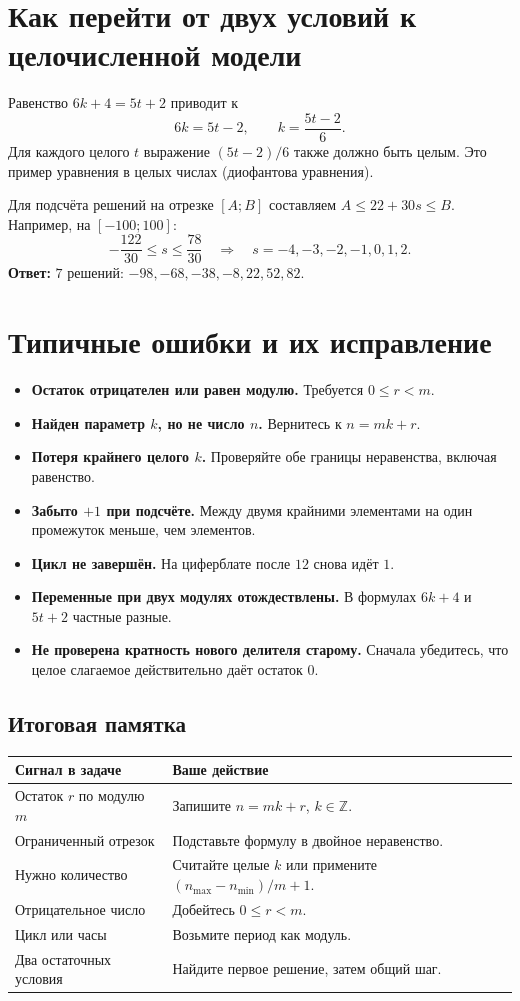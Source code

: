 \documentclass[a4paper,12pt]{article}
\newcommand{\topic}[1]{\section{#1}}
\begin{document}
\topic{Как перейти от двух условий к целочисленной модели}
Равенство $6k+4=5t+2$ приводит к
\[
6k=5t-2,\qquad k=\frac{5t-2}{6}.
\]
Для каждого целого $t$ выражение $(5t-2)/6$ также должно быть целым. Это пример уравнения в целых числах (диофантова уравнения).

Для подсчёта решений на отрезке $[A;B]$ составляем $A\le 22+30s\le B$.
Например, на $[-100;100]$:
\[
-\frac{122}{30}\le s\le\frac{78}{30}
\quad\Longrightarrow\quad s=-4,-3,-2,-1,0,1,2.
\]
\textbf{Ответ:} $7$ решений: $-98,-68,-38,-8,22,52,82$.

\topic{Типичные ошибки и их исправление}
\begin{itemize}
\item \textbf{Остаток отрицателен или равен модулю.} Требуется $0\le r<m$.
\item \textbf{Найден параметр $k$, но не число $n$.} Вернитесь к $n=mk+r$.
\item \textbf{Потеря крайнего целого $k$.} Проверяйте обе границы неравенства, включая равенство.
\item \textbf{Забыто $+1$ при подсчёте.} Между двумя крайними элементами на один промежуток меньше, чем элементов.
\item \textbf{Цикл не завершён.} На циферблате после $12$ снова идёт $1$.
\item \textbf{Переменные при двух модулях отождествлены.} В формулах $6k+4$ и $5t+2$ частные разные.
\item \textbf{Не проверена кратность нового делителя старому.} Сначала убедитесь, что целое слагаемое действительно даёт остаток $0$.
\end{itemize}

\subsection*{Итоговая памятка}
\renewcommand{\arraystretch}{1.30}
\begin{tabularx}{\linewidth}{@{}p{.38\linewidth}X@{}}
\toprule
\textcolor{darkaccent}{\textbf{Сигнал в задаче}} & \textcolor{darkaccent}{\textbf{Ваше действие}}\\
\midrule
Остаток $r$ по модулю $m$ & Запишите $n=mk+r$, $k\in\mathbb Z$.\\
Ограниченный отрезок & Подставьте формулу в двойное неравенство.\\
Нужно количество & Считайте целые $k$ или примените $(n_{\max}-n_{\min})/m+1$.\\
Отрицательное число & Добейтесь $0\le r<m$.\\
Цикл или часы & Возьмите период как модуль.\\
Два остаточных условия & Найдите первое решение, затем общий шаг.\\
\bottomrule
\end{tabularx}
\end{document}
